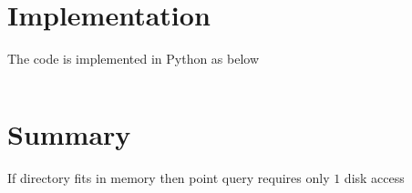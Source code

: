 \documentclass[paper=letter, fontsize=12pt]{article}
\begin{document}

\section{Implementation}
The code is implemented in Python as below

\inputminted[frame=lines, breaklines, linenos]{c}{../krushkal_disjoint_ds.c}



\section{Summary}
\begin{itemize}
	\tick If directory fits in memory then point query requires only $ 1 $ disk access
\end{itemize}
\end{document}
